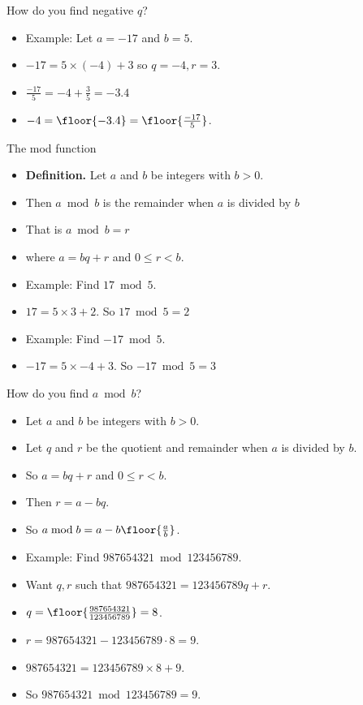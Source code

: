 \documentclass{beamer}
\begin{document}
\begin{frame}{How do you find negative $q$?}

\begin{itemize}
  \item Example: Let $a = -17$ and $b=5$.
  \item $-17 = 5 \times (-4) + 3$ so $q=-4, r=3$.
  \item $\frac{-17}{5} = -4  + \frac{3}{5} = -3.4$
  \item $-4 = \floor{-3.4} = \floor{\frac{-17}{5}}$.
\end{itemize}

\end{frame}

\begin{frame}{The mod function}

\begin{itemize}
 \item \textbf{Definition.} Let $a$ and $b$ be integers with $b>0$.
 \item Then $a\bmod b$ is the remainder when $a$ is divided by $b$
 \item That is $a\bmod b =r$
 \item where $a = bq + r$ and $0\leq r < b$.
 \item Example: Find $17 \bmod 5$.
 \item $17 = 5 \times 3 + 2$. So $17 \bmod 5 = 2$
 \item Example: Find $-17 \bmod 5$.
 \item $-17 = 5 \times -4 + 3$. So $-17 \bmod 5 = 3$
\end{itemize}

\end{frame}

\begin{frame}{How do you find $a\bmod b$?}

\begin{itemize}
\item Let $a$ and $b$ be integers with $b>0$.
\item Let $q$ and $r$ be the quotient
  and remainder when $a$ is divided by $b$.
 \item So $a = bq + r$ and $0\leq r < b$.
 \item Then $r = a - bq$.
 \item So $a\bmod b =  a - b \floor{\frac{a}{b}}$.
 \item Example: Find $987654321 \bmod 123456789$.
 \item Want $q,r$ such that $987654321 = 123456789 q + r$.
 \item $q = \floor{\frac{987654321}{123456789}} = 8$.
 \item $r = 987654321 - 123456789 \cdot 8 = 9$.
 \item $987654321 = 123456789 \times 8 + 9$.
 \item So $987654321 \bmod 123456789 = 9$.
\end{itemize}

\end{frame}
\end{document}
